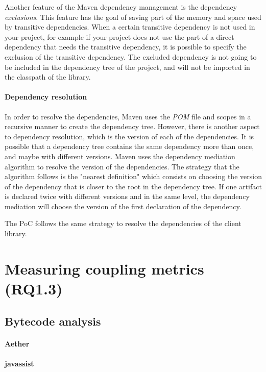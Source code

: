 Another feature of the Maven dependency management is the dependency \textit{exclusions}. This feature has the goal of saving part of the memory and space used by transitive dependencies. When a certain transitive dependency is not used in your project, for example if your project does not use the part of a direct dependency that needs the transitive dependency, it is possible to specify the exclusion of the transitive dependency. The excluded dependency is not going to be included in the dependency tree of the project, and will not be imported in the classpath of the library.

\paragraph{Dependency resolution}
In order to resolve the dependencies, Maven uses the \textit{POM} file and scopes in a recursive manner to create the dependency tree. However, there is another aspect to dependency resolution, which is the version of each of the dependencies. It is possible that a dependency tree contains the same dependency more than once, and maybe with different versions. Maven uses the dependency mediation algorithm to resolve the version of the dependencies. The strategy that the algorithm follows is the "nearest definition" which consists on choosing the version of the dependency that is closer to the root in the dependency tree. If one artifact is declared twice with different versions and in the same level, the dependency mediation will choose the version of the first declaration of the dependency.

The PoC follows the same strategy to resolve the dependencies of the client library.

\section{Measuring coupling metrics (RQ1.3)}

\subsection{Bytecode analysis}

\paragraph{Aether}

\paragraph{javassist}

